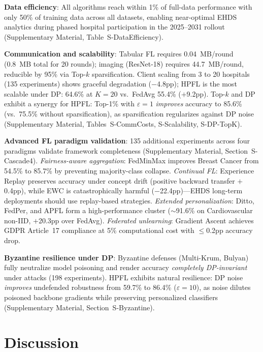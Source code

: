 \documentclass[conference]{IEEEtran}
\begin{document}
\textbf{Data efficiency}: All algorithms reach within 1\% of full-data performance with only 50\% of training data across all datasets, enabling near-optimal EHDS analytics during phased hospital participation in the 2025--2031 rollout (Supplementary Material, Table~S-DataEfficiency).

\textbf{Communication and scalability}: Tabular FL requires 0.04~MB/round (0.8~MB total for 20 rounds); imaging (ResNet-18) requires 44.7~MB/round, reducible by 95\% via Top-$k$ sparsification. Client scaling from 3 to 20 hospitals (135 experiments) shows graceful degradation ($-$4.8pp); HPFL is the most scalable under DP: 64.6\% at $K{=}20$ vs.\ FedAvg 55.4\% ($+$9.2pp). Top-$k$ and DP exhibit a synergy for HPFL: Top-1\% with $\varepsilon{=}1$ \textit{improves} accuracy to 85.6\% (vs.\ 75.5\% without sparsification), as sparsification regularizes against DP noise (Supplementary Material, Tables~S-CommCosts, S-Scalability, S-DP-TopK).

\textbf{Advanced FL paradigm validation}: 135 additional experiments across four paradigms validate framework completeness (Supplementary Material, Section~S-Cascade4). \textit{Fairness-aware aggregation}: FedMinMax improves Breast Cancer from 54.5\% to 85.7\% by preventing majority-class collapse. \textit{Continual FL}: Experience Replay preserves accuracy under concept drift (positive backward transfer $+$0.4pp), while EWC is catastrophically harmful ($-$22.4pp)---EHDS long-term deployments should use replay-based strategies. \textit{Extended personalization}: Ditto, FedPer, and APFL form a high-performance cluster ($\sim$91.6\% on Cardiovascular non-IID, $+$20.3pp over FedAvg). \textit{Federated unlearning}: Gradient Ascent achieves GDPR Article~17 compliance at 5\% computational cost with $\leq$0.2pp accuracy drop.

\textbf{Byzantine resilience under DP}: Byzantine defenses (Multi-Krum, Bulyan) fully neutralize model poisoning and render accuracy \textit{completely DP-invariant} under attacks (198 experiments). HPFL exhibits natural resilience: DP noise \textit{improves} undefended robustness from 59.7\% to 86.4\% ($\varepsilon{=}10$), as noise dilutes poisoned backbone gradients while preserving personalized classifiers (Supplementary Material, Section~S-Byzantine).

\section{Discussion}
\label{sec:discussion}
\end{document}
